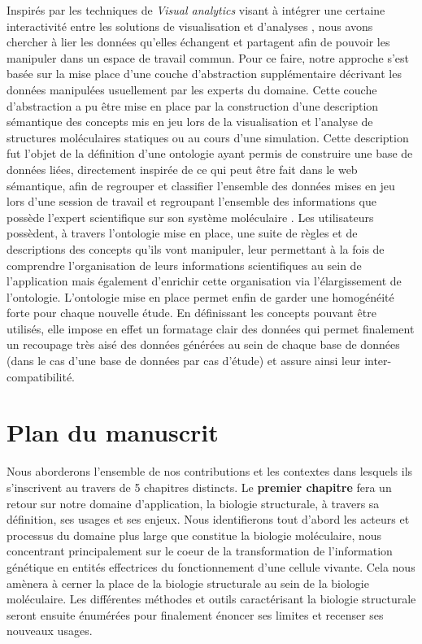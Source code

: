 Inspirés par les techniques de \textit{Visual analytics} visant à intégrer une certaine interactivité entre les solutions de visualisation et d'analyses \cite{kielman2009foundations}, nous avons chercher à lier les données qu'elles échangent et partagent afin de pouvoir les manipuler dans un espace de travail commun.
Pour ce faire, notre approche s'est basée sur la mise place d'une couche d'abstraction supplémentaire décrivant les données manipulées usuellement par les experts du domaine. Cette couche d'abstraction a pu être mise en place par la construction d'une description sémantique des concepts mis en jeu lors de la visualisation et l'analyse de structures moléculaires statiques ou au cours d'une simulation. Cette description fut l'objet de la définition d'une ontologie ayant permis de construire une base de données liées, directement inspirée de ce qui peut être fait dans le web sémantique, afin de regrouper et classifier l'ensemble des données mises en jeu lors d'une session de travail et regroupant l'ensemble des informations que possède l'expert scientifique sur son système moléculaire \cite{berners2001semantic}. Les utilisateurs possèdent, à travers l'ontologie mise en place, une suite de règles et de descriptions des concepts qu'ils vont manipuler, leur permettant à la fois de comprendre l'organisation de leurs informations scientifiques au sein de l'application mais également d'enrichir cette organisation via l'élargissement de l'ontologie. L'ontologie mise en place permet enfin de garder une homogénéité forte pour chaque nouvelle étude. En définissant les concepts pouvant être utilisés, elle impose en effet un formatage clair des données qui permet finalement un recoupage très aisé des données générées au sein de chaque base de données (dans le cas d'une base de données par cas d'étude) et assure ainsi leur inter-compatibilité.


\section*{Plan du manuscrit}

Nous aborderons l'ensemble de nos contributions et les contextes dans lesquels ils s'inscrivent au travers de 5 chapitres distincts. 
Le \textbf{premier chapitre} fera un retour sur notre domaine d'application, la biologie structurale, à travers sa définition, ses usages et ses enjeux. Nous identifierons tout d'abord les acteurs et processus du domaine plus large que constitue la biologie moléculaire, nous concentrant principalement sur le coeur de la transformation de l'information génétique en entités effectrices du fonctionnement d'une cellule vivante. Cela nous amènera à cerner la place de la biologie structurale au sein de la biologie moléculaire. Les différentes méthodes et outils caractérisant la biologie structurale seront ensuite énumérées pour finalement énoncer ses limites et recenser ses nouveaux usages.

